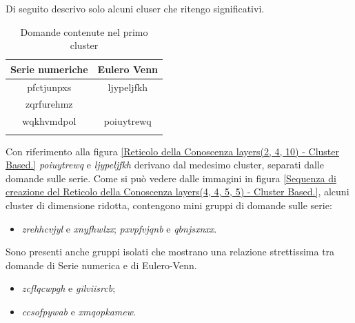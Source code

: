 Di seguito descrivo solo alcuni cluser che ritengo significativi.
\begin{longtable}{|c|c|}
	\hline
	\textbf{Serie numeriche} & \textbf{Eulero Venn} \\\hline\hline
	pfctjunpxs & ljypeljfkh \\
	zqrfurehmz & \\
	wqkhvmdpol & poiuytrewq\\ 
\hline
\caption{Domande contenute nel primo cluster}\label{tab:Domande contenute nel primo cluster (rosa)}
\end{longtable}
\noindent
Con riferimento alla figura \ref{Reticolo della Conoscenza layers(2, 4, 10) - Cluster Based.} \textit{poiuytrewq} e \textit{ljypeljfkh} derivano dal medesimo cluster, separati dalle domande sulle serie.
\noindent
Come si può vedere dalle immagini in figura \ref{Sequenza di creazione del Reticolo della Conoscenza layers(4, 4, 5, 5) - Cluster Based.},  alcuni cluster di dimensione ridotta, contengono mini gruppi di domande sulle serie:
\begin{itemize}
\item \textit{zrehhcvjyl} e \textit{xnyfhwlzx};
\textit{pxvpfvjqnb} e \textit{qbnjsxnxx}.
\end{itemize}
\noindent
Sono presenti anche gruppi isolati che mostrano una relazione strettissima tra domande di Serie numerica e di Eulero-Venn.
\begin{itemize}
\item \textit{zcflqcwpgh} e \textit{gilviisrcb};
\item \textit{ccsofpywab} e \textit{xmqopkamew}.
\end{itemize}
\noindent

